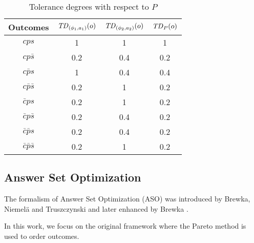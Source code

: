 \begin{table}
  \centering
  \small
  \begin{tabular}{ |c||c|c|c| }
    \hline
    Outcomes                 & $\mathit{TD}_{(\phi_1,a_1)}(o)$  & $\mathit{TD}_{(\phi_2,a_2)}(o)$ & $\mathit{TD}_P(o)$ \\
    \hline \hline
    $cps$    								 & 1    & 1     & 1 \\
    \hline
    $cp\bar{s}$               & 0.2  & 0.4   & 0.2 \\
    \hline
    $c\bar{p} s$              & 1    & 0.4   & 0.4 \\
    \hline
    $c\bar{p}\bar{s}$          & 0.2  & 1     & 0.2 \\
    \hline
    $\bar{c} ps$              & 0.2  & 1     & 0.2 \\
    \hline
    $\bar{c} p\bar{s}$         & 0.2  & 0.4   & 0.2 \\
    \hline
    $\bar{c} \bar{p} s$        & 0.2  & 0.4   & 0.2 \\
    \hline
    $\bar{c} \bar{p} \bar{s}$   & 0.2  & 1     & 0.2 \\
    \hline
  \end{tabular}
  \caption{Tolerance degrees with respect to $P$}
  \label{tbl:poss_ex}
\end{table}


\subsection{Answer Set Optimization}
The formalism of Answer Set Optimization (ASO) was introduced by
Brewka, Niemel\"a and Truszczynski \cite{Brewka03answerset} and
later enhanced by Brewka \cite{Brewka04}.

In this work, we focus on the original framework \cite{Brewka03answerset} where 
the Pareto method is used to order outcomes.

